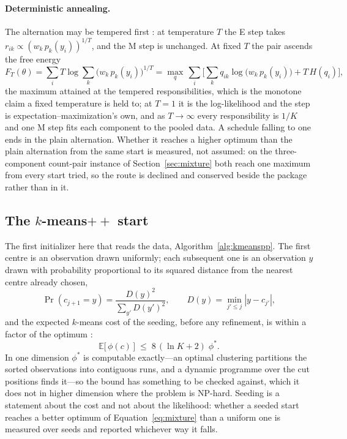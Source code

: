 \documentclass[11pt,a4paper]{article}
\begin{document}
\paragraph{Deterministic annealing.}
The alternation may be tempered first \citep{ueda1998}: at temperature $T$
the E step takes $r_{ik} \propto (w_k\,p_k(y_i))^{1/T}$, and the M step is
unchanged. At fixed $T$ the pair ascends the free energy
\begin{equation}
  F_T(\theta) = \sum_i T \log \sum_k \big(w_k\,p_k(y_i)\big)^{1/T}
  = \max_{q}\, \sum_i \Big[\sum_k q_{ik} \log\big(w_k\,p_k(y_i)\big) + T\,H(q_i)\Big],
  \label{eq:da-em}
\end{equation}
the maximum attained at the tempered responsibilities, which is the monotone
claim a fixed temperature is held to; at $T = 1$ it is the log-likelihood and
the step is expectation--maximization's own, and as $T \to \infty$ every
responsibility is $1/K$ and one M step fits each component to the pooled data.
A schedule falling to one ends in the plain alternation. Whether it reaches a
higher optimum than the plain alternation from the same start is measured,
not assumed: on the three-component count-pair instance of
Section~\ref{sec:mixture} both reach one maximum from every start tried,
so the route is declined and conserved beside the package rather than in it.

\subsection{The $k$-means$++$ start}
The first initializer here that reads the data, Algorithm~\ref{alg:kmeanspp}. The first centre is an
observation drawn uniformly; each subsequent one is an observation $y$ drawn
with probability proportional to its squared distance from the nearest centre
already chosen,
\begin{equation}
  \Pr(c_{j+1} = y) = \frac{D(y)^2}{\sum_{y'} D(y')^2},
  \qquad
  D(y) = \min_{j' \le j} |y - c_{j'}| ,
  \label{eq:kmeanspp}
\end{equation}
and the expected $k$-means cost of the seeding, before any refinement, is
within a factor of the optimum \citep{arthur2007}:
\begin{equation}
  \mathbb{E}\big[\,\phi(c)\,\big] \;\le\; 8\,(\ln K + 2)\; \phi^{\ast} .
  \label{eq:kmeanspp-bound}
\end{equation}
In one dimension $\phi^{\ast}$ is computable exactly---an optimal clustering
partitions the sorted observations into contiguous runs, and a dynamic
programme over the cut positions finds it---so the bound has something to be
checked against, which it does not in higher dimension where the problem is
NP-hard. Seeding is a statement about the cost and not about the likelihood:
whether a seeded start reaches a better optimum of Equation~\ref{eq:mixture}
than a uniform one is measured over seeds and reported whichever way it falls.
\end{document}

